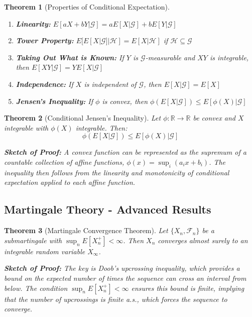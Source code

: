 \documentclass[12pt,a4paper]{article}
\newtheorem{theorem}{Theorem}[section]
\theoremstyle{remark}
\begin{document}
\begin{theorem}[Properties of Conditional Expectation]
\begin{enumerate}
\item \textbf{Linearity:} $E[aX + bY|\mathcal{G}] = aE[X|\mathcal{G}] + bE[Y|\mathcal{G}]$
\item \textbf{Tower Property:} $E[E[X|\mathcal{G}]|\mathcal{H}] = E[X|\mathcal{H}]$ if $\mathcal{H} \subseteq \mathcal{G}$
\item \textbf{Taking Out What is Known:} If $Y$ is $\mathcal{G}$-measurable and $XY$ is integrable, then $E[XY|\mathcal{G}] = YE[X|\mathcal{G}]$
\item \textbf{Independence:} If $X$ is independent of $\mathcal{G}$, then $E[X|\mathcal{G}] = E[X]$
\item \textbf{Jensen's Inequality:} If $\phi$ is convex, then $\phi(E[X|\mathcal{G}]) \leq E[\phi(X)|\mathcal{G}]$
\end{enumerate}
\end{theorem}

\begin{theorem}[Conditional Jensen's Inequality]
Let $\phi: \mathbb{R} \to \mathbb{R}$ be convex and $X$ integrable with $\phi(X)$ integrable. Then:
$$\phi(E[X|\mathcal{G}]) \leq E[\phi(X)|\mathcal{G}]$$

\textbf{Sketch of Proof:} A convex function can be represented as the supremum of a countable collection of affine functions, $\phi(x) = \sup_i (a_i x + b_i)$. The inequality then follows from the linearity and monotonicity of conditional expectation applied to each affine function.
\end{theorem}

\subsection{Martingale Theory - Advanced Results}

\begin{theorem}[Martingale Convergence Theorem]
Let $\{X_n, \mathcal{F}_n\}$ be a submartingale with $\sup_n E[X_n^+] < \infty$. Then $X_n$ converges almost surely to an integrable random variable $X_\infty$.

\textbf{Sketch of Proof:} The key is Doob's upcrossing inequality, which provides a bound on the expected number of times the sequence can cross an interval from below. The condition $\sup_n E[X_n^+] < \infty$ ensures this bound is finite, implying that the number of upcrossings is finite a.s., which forces the sequence to converge.
\end{theorem}
\end{document}
